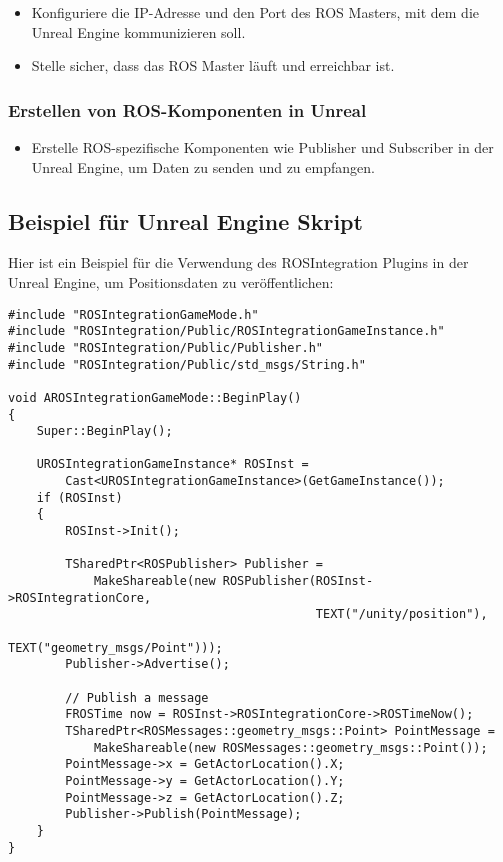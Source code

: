\begin{itemize}
    \item Konfiguriere die IP-Adresse und den Port des ROS Masters, mit dem die Unreal Engine kommunizieren soll.
    \item Stelle sicher, dass das ROS Master läuft und erreichbar ist.
\end{itemize}

\subsubsection{Erstellen von ROS-Komponenten in Unreal}

\begin{itemize}
    \item Erstelle ROS-spezifische Komponenten wie Publisher und Subscriber in der Unreal Engine, um Daten zu senden und zu empfangen.
\end{itemize}

\subsection{Beispiel für Unreal Engine Skript}

Hier ist ein Beispiel für die Verwendung des ROSIntegration Plugins in der Unreal Engine, um Positionsdaten zu veröffentlichen:

\begin{verbatim}
#include "ROSIntegrationGameMode.h"
#include "ROSIntegration/Public/ROSIntegrationGameInstance.h"
#include "ROSIntegration/Public/Publisher.h"
#include "ROSIntegration/Public/std_msgs/String.h"

void AROSIntegrationGameMode::BeginPlay()
{
    Super::BeginPlay();

    UROSIntegrationGameInstance* ROSInst = 
        Cast<UROSIntegrationGameInstance>(GetGameInstance());
    if (ROSInst)
    {
        ROSInst->Init();

        TSharedPtr<ROSPublisher> Publisher = 
            MakeShareable(new ROSPublisher(ROSInst->ROSIntegrationCore, 
                                           TEXT("/unity/position"), 
                                           TEXT("geometry_msgs/Point")));
        Publisher->Advertise();
        
        // Publish a message
        FROSTime now = ROSInst->ROSIntegrationCore->ROSTimeNow();
        TSharedPtr<ROSMessages::geometry_msgs::Point> PointMessage = 
            MakeShareable(new ROSMessages::geometry_msgs::Point());
        PointMessage->x = GetActorLocation().X;
        PointMessage->y = GetActorLocation().Y;
        PointMessage->z = GetActorLocation().Z;
        Publisher->Publish(PointMessage);
    }
}
\end{verbatim}

